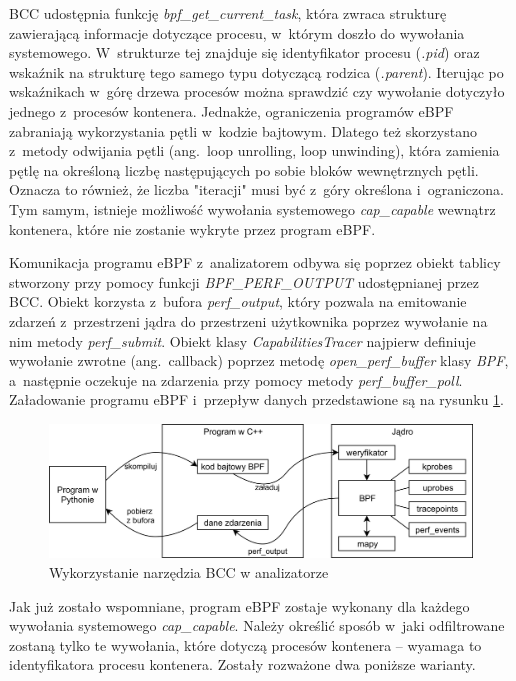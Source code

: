 BCC udostępnia funkcję \textit{bpf_get_current_task}, która zwraca strukturę zawierającą informacje dotyczące procesu, w~którym doszło do wywołania systemowego. W~strukturze tej znajduje się identyfikator procesu (\textit{.pid}) oraz wskaźnik na strukturę tego samego typu dotyczącą rodzica (\textit{.parent}). Iterując po wskaźnikach w~górę drzewa procesów można sprawdzić czy wywołanie dotyczyło jednego z~procesów kontenera. Jednakże, ograniczenia programów eBPF zabraniają wykorzystania pętli w~kodzie bajtowym. Dlatego też skorzystano z~metody odwijania pętli (ang.~loop unrolling, loop unwinding), która zamienia pętlę na określoną liczbę następujących po sobie bloków wewnętrznych pętli. Oznacza to również, że liczba "iteracji" musi być z~góry określona i~ograniczona. Tym samym, istnieje możliwość wywołania systemowego \textit{cap_capable} wewnątrz kontenera, które nie zostanie wykryte przez program eBPF.

Komunikacja programu eBPF z~analizatorem odbywa się poprzez obiekt tablicy stworzony przy pomocy funkcji \textit{BPF_PERF_OUTPUT} udostępnianej przez BCC. Obiekt korzysta z~bufora \textit{perf_output}, który pozwala na emitowanie zdarzeń z~przestrzeni jądra do przestrzeni użytkownika poprzez wywołanie na nim metody \textit{perf_submit}. Obiekt klasy \textit{CapabilitiesTracer} najpierw definiuje wywołanie zwrotne (ang.~callback) poprzez metodę \textit{open_perf_buffer} klasy \textit{BPF}, a~następnie oczekuje na zdarzenia przy pomocy metody \textit{perf_buffer_poll}. Załadowanie programu eBPF i~przepływ danych przedstawione są na rysunku \ref{fig:analyzerBPF}.

\begin{figure}[ht]
    \centering
    \includegraphics[width=0.9\linewidth]{images/analyzerBPF.png}
    \caption{Wykorzystanie narzędzia BCC w analizatorze}
    \label{fig:analyzerBPF}
\end{figure}

Jak już zostało wspomniane, program eBPF zostaje wykonany dla każdego wywołania systemowego \textit{cap_capable}. Należy określić sposób w~jaki odfiltrowane zostaną tylko te wywołania, które dotyczą procesów kontenera -- wyamaga to identyfikatora procesu kontenera. Zostały rozważone dwa poniższe warianty.

